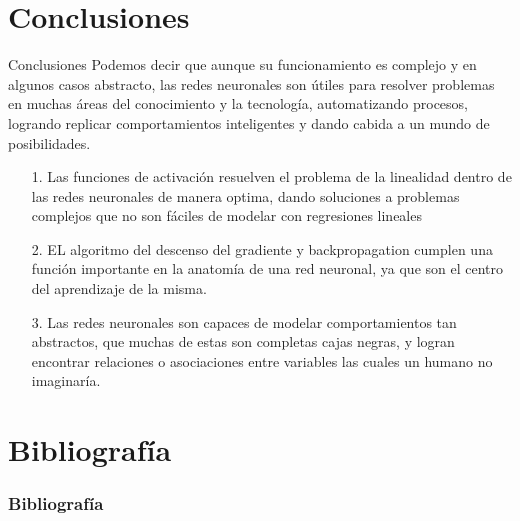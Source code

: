 \documentclass[10pt]{beamer}
\begin{document}
\section{Conclusiones}
\begin{frame}{Conclusiones}
Podemos decir que aunque su funcionamiento es complejo y en algunos casos abstracto, las redes neuronales son útiles para resolver problemas en muchas áreas del conocimiento y la tecnología, automatizando procesos, logrando replicar comportamientos inteligentes y dando cabida a un mundo de posibilidades.

\begin{itemize}
\item[1.] Las funciones de activación resuelven el problema de la linealidad dentro de las redes neuronales de manera optima, dando soluciones a problemas complejos que no son fáciles de modelar con regresiones lineales

\item[2.] EL algoritmo del descenso del gradiente y backpropagation cumplen una función importante en la anatomía de una red neuronal, ya que son el centro del aprendizaje de la misma.

\item[3.]Las redes neuronales son capaces de modelar comportamientos tan abstractos, que muchas de estas son completas cajas negras, y logran encontrar relaciones o asociaciones entre variables las cuales un humano no imaginaría.

\end{itemize}
\end{frame}


\section{Bibliografía}
\begin{frame}
  \frametitle{Bibliografía}
  
\nocite{L,EyH,Y}
  
  
  
\end{frame}
\end{document}
